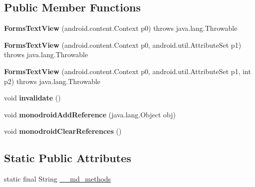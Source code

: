 \subsection*{Public Member Functions}
\begin{DoxyCompactItemize}
\item 
\mbox{\label{classmd5b60ffeb829f638581ab2bb9b1a7f4f3f_1_1FormsTextView_aafad6c761c1d359ba5d9ba2e7d58f6a6}} 
{\bfseries Forms\+Text\+View} (android.\+content.\+Context p0)  throws java.\+lang.\+Throwable 	
\item 
\mbox{\label{classmd5b60ffeb829f638581ab2bb9b1a7f4f3f_1_1FormsTextView_a7d3c80cbb7333b06cbafacf194ac26ec}} 
{\bfseries Forms\+Text\+View} (android.\+content.\+Context p0, android.\+util.\+Attribute\+Set p1)  throws java.\+lang.\+Throwable 	
\item 
\mbox{\label{classmd5b60ffeb829f638581ab2bb9b1a7f4f3f_1_1FormsTextView_a9cd58a7bb5d5ce0c7076ae35404b2138}} 
{\bfseries Forms\+Text\+View} (android.\+content.\+Context p0, android.\+util.\+Attribute\+Set p1, int p2)  throws java.\+lang.\+Throwable 	
\item 
\mbox{\label{classmd5b60ffeb829f638581ab2bb9b1a7f4f3f_1_1FormsTextView_a93c3c0adf589f26fea5031e1e9b484c3}} 
void {\bfseries invalidate} ()
\item 
\mbox{\label{classmd5b60ffeb829f638581ab2bb9b1a7f4f3f_1_1FormsTextView_a20925dbf92ee998bfae5cc3aca483f3a}} 
void {\bfseries monodroid\+Add\+Reference} (java.\+lang.\+Object obj)
\item 
\mbox{\label{classmd5b60ffeb829f638581ab2bb9b1a7f4f3f_1_1FormsTextView_aae0338a9a14411e891317f37a37f4f58}} 
void {\bfseries monodroid\+Clear\+References} ()
\end{DoxyCompactItemize}
\subsection*{Static Public Attributes}
\begin{DoxyCompactItemize}
\item 
static final String \hyperlink{classmd5b60ffeb829f638581ab2bb9b1a7f4f3f_1_1FormsTextView_ad4f9b582e68f2509120a1f5414c09541}{\+\_\+\+\_\+md\+\_\+methods}
\end{DoxyCompactItemize}
